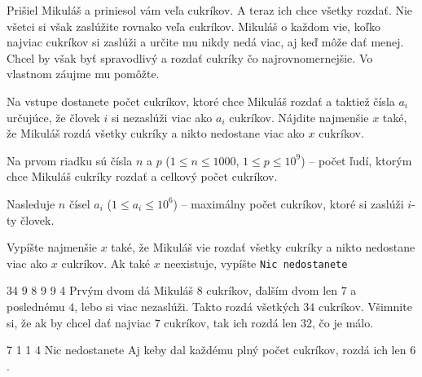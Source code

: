 





Prišiel Mikuláš a priniesol vám veľa cukríkov. A teraz ich chce všetky rozdať. Nie všetci si však
zaslúžite rovnako veľa cukríkov. Mikuláš o každom vie, koľko najviac cukríkov si zaslúži a určite mu
nikdy nedá viac, aj keď môže dať menej. Chcel by však byť spravodlivý a rozdať cukríky čo
najrovnomernejšie. Vo vlastnom záujme mu pomôžte.


Na vstupe dostanete počet cukríkov, ktoré chce Mikuláš rozdať a taktiež čísla $a_i$ určujúce, že
človek $i$ si nezaslúži viac ako $a_i$ cukríkov. Nájdite najmenšie $x$ také, že Mikuláš rozdá všetky
cukríky a nikto nedostane viac ako $x$ cukríkov.


Na prvom riadku sú čísla $n$ a $p$ ($1 \leq n \leq 1000$, $1 \leq p \leq 10^9$) -- počet ľudí,
ktorým chce Mikuláš cukríky rozdať a celkový počet cukríkov.

Nasleduje $n$ čísel $a_i$ ($1 \leq a_i \leq 10^6$) -- maximálny počet cukríkov, ktoré si zaslúži
$i$-ty človek.


Vypíšte najmenšie $x$ také, že Mikuláš vie rozdať všetky cukríky a nikto nedostane viac ako $x$
cukríkov. Ak také $x$ neexistuje, vypíšte \texttt{Nic nedostanete}


 34
9 8 9 9 4
\komentar
Prvým dvom dá Mikuláš $8$ cukríkov, ďalším dvom len $7$ a poslednému $4$, lebo si viac nezaslúži.
Takto rozdá všetkých $34$ cukríkov. Všimnite si, že ak by chcel dať najviac $7$ cukríkov, tak ich
rozdá len $32$, čo je málo.
\koniec

 7
1 1 4
\vystup
Nic nedostanete
\komentar
Aj keby dal každému plný počet cukríkov, rozdá ich len $6$.
\koniec


